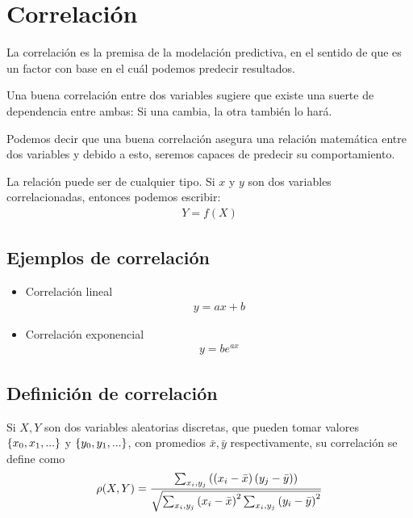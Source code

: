 \section{Correlación}

La correlación es la premisa de la modelación predictiva, en el sentido de que es un factor con base en el cuál podemos predecir resultados.


Una buena correlación entre dos variables sugiere que existe una suerte de dependencia entre ambas:  Si una cambia, la otra también lo hará. 

Podemos decir que una buena correlación asegura una relación matemática entre dos variables y debido a esto, seremos capaces de predecir su comportamiento.


La relación puede ser de cualquier tipo.  Si $x$ y $y$ son dos variables correlacionadas, entonces podemos escribir:
\begin{align}
	Y=f(X)
\end{align}

\subsection{Ejemplos de correlación}
\begin{itemize}
	\item Correlación lineal
	\begin{align}
		y = ax+b
	\end{align}
	\item Correlación exponencial
	\begin{align}
		y = be^{ax}
	\end{align}
\end{itemize}


\subsection{Definición de correlación} Si $X,Y$ son dos variables aleatorias discretas, que pueden tomar valores $\left\{ x_{0},x_{1},... \right\}$ y $\left\{ y_{0},y_{1},... \right\}$, con promedios $\bar{x}, \bar{y}$  respectivamente, su correlación se define como
\begin{align}
	\rho(X,Y) = \dfrac{\sum_{x_{i},y_{j}}
		\left( \left( x_{i}-\bar{x} \right)\left( y_{j}-\bar{y} \right) \right)}
	{\sqrt{\sum_{x_{i},y_{j}}
			\left( x_{i}-\bar{x} \right)^{2}\sum_{x_{i},y_{j}}
			\left( y_{i}-\bar{y} \right)^{2}}}
\end{align}



